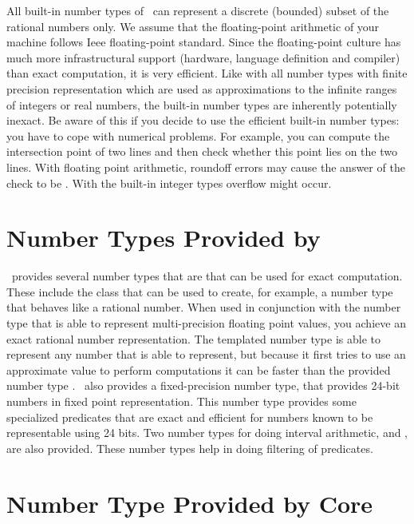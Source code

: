 All built-in number types of \CC\ can represent a discrete (bounded)
subset of the rational numbers only.  We assume that the
floating-point arithmetic of your machine follows {\sc Ieee}
floating-point standard.  Since the floating-point culture has much
more infrastructural support (hardware, language definition and
compiler) than exact computation, it is very efficient.
Like with all number types with finite precision representation
which are used as approximations to the infinite ranges of 
integers or real numbers, the built-in number types are inherently
potentially inexact.
Be aware of this if you decide to use the efficient built-in 
number types: you have to cope with numerical problems.  
For example, you can compute the intersection point of two lines and 
then check whether this point lies on the two lines. 
With floating point arithmetic,
roundoff errors may cause the answer of the check to be . 
With the built-in integer types overflow might occur.

\section{Number Types Provided by \cgal}

\cgal\ provides several number types that are that can be used for 
exact computation.  These include the  class that can
be used to create, for example, a number type that behaves like a rational
number.  When used in conjunction with the number type  that
is able to represent multi-precision floating point values, you achieve
an exact rational number representation.  The templated number type
 is able to represent any number that  is able
to represent, but because it first tries to use an approximate value to
perform computations it can be faster than the provided number type .
\cgal\ also provides a fixed-precision number type,
 that provides 24-bit numbers in fixed point
representation.  This number type provides some specialized predicates
that are exact and efficient for numbers known to be representable using
24 bits.
Two number types for doing interval arithmetic,  and
, are also provided.  These number types
help in doing filtering of predicates.

\section{Number Type Provided by {\sc Core}}
\label{CORE}

